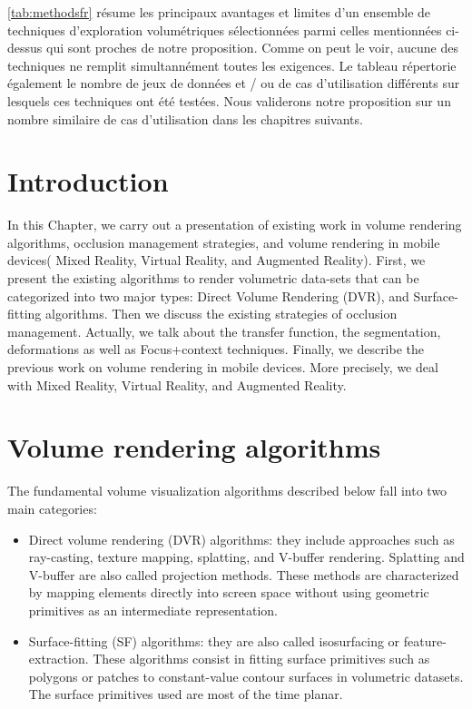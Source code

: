 \autoref{tab:methodsfr} résume les principaux avantages et limites d'un ensemble de techniques d'exploration volumétriques sélectionnées parmi celles mentionnées ci-dessus qui sont proches de notre proposition. Comme on peut le voir, aucune des techniques ne remplit simultannément  toutes les exigences. Le tableau répertorie également le nombre de jeux de données et / ou de cas d'utilisation différents sur lesquels ces techniques ont été testées. Nous validerons notre proposition sur un nombre similaire de cas d'utilisation dans les chapitres suivants.

\NewPage

\section{Introduction}

In this Chapter, we carry out a presentation of existing work in volume rendering algorithms, occlusion management strategies, and volume rendering in mobile devices( Mixed Reality, Virtual Reality, and Augmented Reality). First, we present the existing algorithms to render volumetric data-sets that can be categorized into two major types: Direct Volume Rendering (DVR), and Surface-fitting algorithms. Then we discuss the existing strategies of occlusion management. Actually, we talk about the transfer function, the segmentation, deformations as well as Focus+context techniques. Finally, we describe the previous work on volume rendering in mobile devices. More precisely, we deal with Mixed Reality, Virtual Reality, and Augmented Reality.



\section{Volume rendering algorithms}

The fundamental volume visualization algorithms described
below fall into two main categories: 

\begin{itemize}

\item Direct volume rendering (DVR) algorithms: they include approaches such as ray-casting, texture mapping, splatting, and V-buffer rendering. Splatting and V-buffer are also called projection methods. These methods are characterized by mapping elements directly into screen space without using geometric primitives as an intermediate representation.

\item Surface-fitting (SF) algorithms: they are also called isosurfacing or feature-extraction. These algorithms consist in fitting surface primitives such as
polygons or patches to constant-value contour surfaces in volumetric datasets. The surface primitives used are most of the time planar.

\end{itemize}

